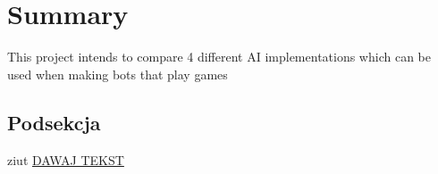 \section{Summary}
This project intends to compare 4 different AI implementations 
which can be used when making bots that play games

\subsection{Podsekcja}
ziut
\hyperref[sec:neat]{DAWAJ TEKST}